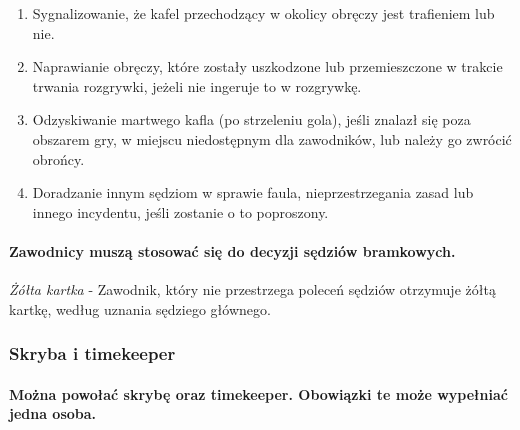 \documentclass[12pt]{article}
\begin{document}
\begin{enumerate}
\item Sygnalizowanie, że kafel przechodzący w okolicy obręczy jest
trafieniem lub nie.

\item Naprawianie obręczy, które zostały uszkodzone lub przemieszczone w
trakcie trwania rozgrywki, jeżeli nie ingeruje to w rozgrywkę.

\item Odzyskiwanie martwego kafla (po strzeleniu gola), jeśli znalazł się
poza obszarem gry, w miejscu niedostępnym dla zawodników, lub należy go
zwrócić obrońcy.

\item Doradzanie innym sędziom w sprawie faula, nieprzestrzegania zasad lub
innego incydentu, jeśli zostanie o to poproszony.
\end{enumerate}

\paragraph{Zawodnicy muszą stosować się do decyzji sędziów
bramkowych.}

\emph{Żółta kartka} - Zawodnik, który nie przestrzega poleceń sędziów
otrzymuje żółtą kartkę, według uznania sędziego głównego.

\subsubsection{Skryba i timekeeper}

\paragraph{Można powołać skrybę oraz timekeeper. Obowiązki te
może wypełniać jedna osoba.}
\end{document}
